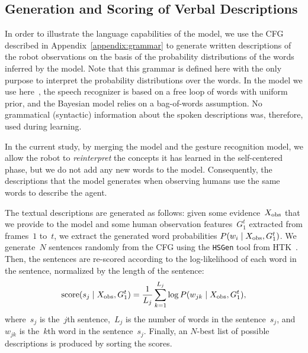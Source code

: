\subsection{Generation and Scoring of Verbal Descriptions}
\label{sec:approach:verbal}

In order to illustrate the language capabilities of the model, we use the \ac{CFG} described in Appendix~\ref{appendix:grammar} to generate written descriptions of the robot observations on the basis of the probability distributions of the words inferred by the model.
Note that this grammar is defined here with the only purpose to interpret the probability distributions over the words.
In the \AffWords{} model we use here~\cite{salvi:2012:smcb}, the speech recognizer is based on a free loop of words with uniform prior, and the Bayesian model relies on a bag-of-words assumption.
No grammatical (syntactic) information about the spoken descriptions was, therefore, used during learning.

In the current study, by merging the \AffWords{} model and the gesture recognition model, we allow the robot to \emph{reinterpret} the concepts it has learned in the self-centered phase, but we do not add any new words to the model.
Consequently, the descriptions that the model generates when observing humans use the same words to describe the agent.

The textual descriptions are generated as follows: given some evidence~$X_\text{obs}$ that we provide to the model and some human observation features~$G_1^t$ extracted from frames~$1$ to~$t$, we extract the generated word probabilities
$P(w_i \mid X_\text{obs}, G_1^t)$.
We generate~$N$ sentences randomly from the \ac{CFG} using the \texttt{HSGen} tool from HTK~\cite{young:htkbook}.
Then, the sentences are re-scored according to the log-likelihood of each word in the sentence, normalized by the length of the sentence:
\begin{equation} \label{eq:sentence_score}
  \text{score}(s_j \given \xobs, G_1^t) = \frac{1}{L_j} \sum_{k=1}^{L_j} \log P(w_{jk} \given \xobs, G_1^t),
\end{equation}
where~$s_j$ is the~$j$th sentence,~$L_j$ is the number of words in the sentence~$s_j$, and~$w_{jk}$ is the~$k$th word in the sentence~$s_j$.
Finally, an $N$-best list of possible descriptions is produced by sorting the scores.

